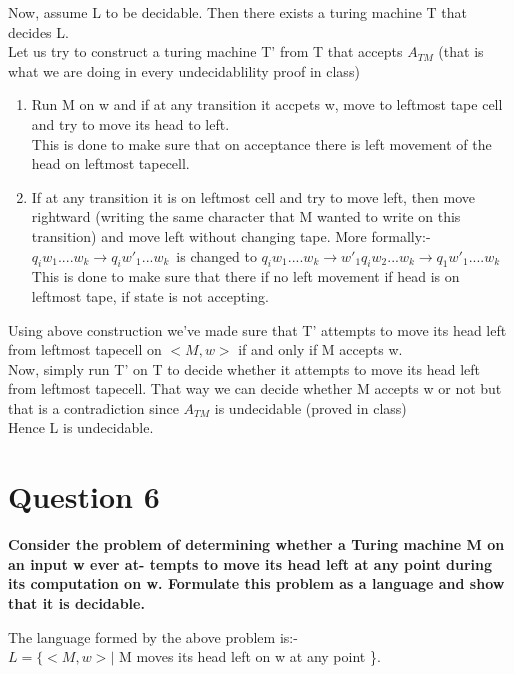 \documentclass{article}
\begin{document}
Now, assume L to be decidable. Then there exists a turing machine T that decides L.\\
Let us try to construct a turing machine T' from T that accepts $A_{TM}$ (that is what we are doing in every undecidablility proof in class)
\begin{enumerate}
    \item Run M on w and if at any transition it accpets w, move to leftmost tape cell and try to move its head to left.\\
        This is done to make sure that on acceptance there is left movement of the head on leftmost tapecell.\\
    \item If at any transition it is on leftmost cell and try to move left, then move rightward (writing the same character that M wanted to write on this transition) and move 
            left without changing tape. More formally:- \\
            $q_iw_1....w_k \rightarrow q_iw'_1...w_k $\ is changed to $q_iw_1....w_k \rightarrow w'_1q_iw_2...w_k \rightarrow q_1w'_1....w_k$\\
            This is done to make sure that there if no left movement if head is on leftmost tape, if state is not accepting.
\end{enumerate} 

Using above construction we've made sure that T' attempts to move its head left from leftmost tapecell on $<M,w>$ if and only if M accepts w.\\
Now, simply run T' on T to decide whether it attempts to move its head left from leftmost tapecell. That way we can decide whether M accepts w or not but that is 
a contradiction since $A_{TM}$ is undecidable (proved in class)\\
Hence L is undecidable.

\pagebreak


\section{Question 6}

\textbf{Consider the problem of determining whether a Turing machine M on an input w ever at-
tempts to move its head left at any point during its computation on w. Formulate this
problem as a language and show that it is decidable.\\}

The language formed by the above problem is:- \\
$L = \{ <M,w> |$ M moves its head left on w at any point \}.\\
\end{document}
